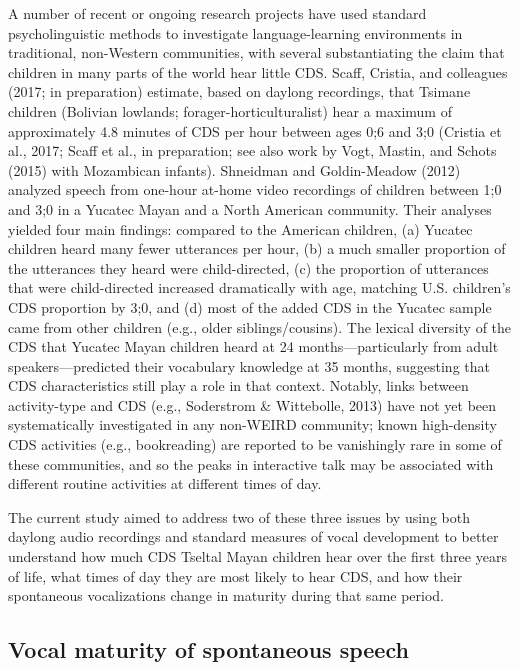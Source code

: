 \documentclass[,man,floatsintext]{apa6}
\begin{document}
A number of recent or ongoing research projects have used standard
psycholinguistic methods to investigate language-learning environments
in traditional, non-Western communities, with several substantiating the
claim that children in many parts of the world hear little CDS. Scaff,
Cristia, and colleagues (2017; in preparation) estimate, based on
daylong recordings, that Tsimane children (Bolivian lowlands;
forager-horticulturalist) hear a maximum of approximately 4.8 minutes of
CDS per hour between ages 0;6 and 3;0 (Cristia et al., 2017; Scaff et
al., in preparation; see also work by Vogt, Mastin, and Schots (2015)
with Mozambican infants). Shneidman and Goldin-Meadow (2012) analyzed
speech from one-hour at-home video recordings of children between 1;0
and 3;0 in a Yucatec Mayan and a North American community. Their
analyses yielded four main findings: compared to the American children,
(a) Yucatec children heard many fewer utterances per hour, (b) a much
smaller proportion of the utterances they heard were child-directed, (c)
the proportion of utterances that were child-directed increased
dramatically with age, matching U.S. children's CDS proportion by 3;0,
and (d) most of the added CDS in the Yucatec sample came from other
children (e.g., older siblings/cousins). The lexical diversity of the
CDS that Yucatec Mayan children heard at 24 months---particularly from
adult speakers---predicted their vocabulary knowledge at 35 months,
suggesting that CDS characteristics still play a role in that context.
Notably, links between activity-type and CDS (e.g., Soderstrom \&
Wittebolle, 2013) have not yet been systematically investigated in any
non-WEIRD community; known high-density CDS activities (e.g.,
bookreading) are reported to be vanishingly rare in some of these
communities, and so the peaks in interactive talk may be associated with
different routine activities at different times of day.

The current study aimed to address two of these three issues by using
both daylong audio recordings and standard measures of vocal development
to better understand how much CDS Tseltal Mayan children hear over the
first three years of life, what times of day they are most likely to
hear CDS, and how their spontaneous vocalizations change in maturity
during that same period.

\subsection{Vocal maturity of spontaneous
speech}\label{vocal-maturity-of-spontaneous-speech}
\end{document}
